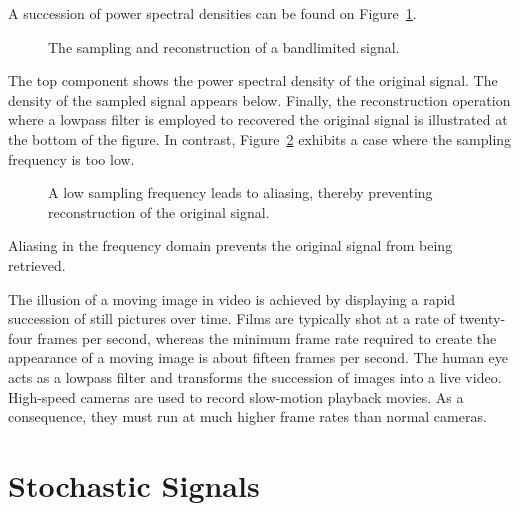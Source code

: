 A succession of power spectral densities can be found on Figure~\ref{figure:Sampling}.
\begin{figure}[htbp]
\begin{center}
\caption{The sampling and reconstruction of a bandlimited signal.}
\label{figure:Sampling}
\end{center}
\end{figure}
The top component shows the power spectral density of the original signal.
The density of the sampled signal appears below.
Finally, the reconstruction operation where a lowpass filter is employed to recovered the original signal is illustrated at the bottom of the figure.
In contrast, Figure~\ref{figure:Aliasing} exhibits a case where the sampling frequency is too low.
\begin{figure}[htbp]
\begin{center}
\caption{A low sampling frequency leads to aliasing, thereby preventing reconstruction of the original signal.}
\label{figure:Aliasing}
\end{center}
\end{figure}
Aliasing in the frequency domain prevents the original signal from being retrieved.

The illusion of a moving image in video is achieved by displaying a rapid succession of still pictures over time.
Films are typically shot at a rate of twenty-four frames per second, whereas the minimum frame rate required to create the appearance of a moving image is about fifteen frames per second.
The human eye acts as a lowpass filter and transforms the succession of images into a live video.
High-speed cameras are used to record slow-motion playback movies.
As a consequence, they must run at much higher frame rates than normal cameras.


\section{Stochastic Signals}

